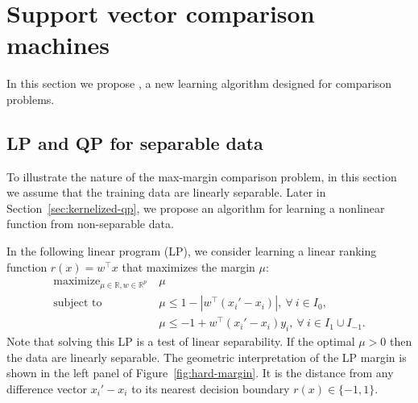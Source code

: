 \documentclass{article}
\newcommand{\RR}{\mathbb R}
\DeclareMathOperator*{\maximize}{maximize}
\begin{document}
\section{Support vector comparison machines}
\label{sec:svm-compare}

In this section we propose , a new learning algorithm
designed for comparison problems.

\subsection{LP and QP for separable data}
\label{sec:lp-qp}

To illustrate the nature of the max-margin comparison problem, in this
section we assume that the training data are linearly separable. Later
in Section~\ref{sec:kernelized-qp}, we propose an algorithm for
learning a nonlinear function from non-separable data.

In the following linear program (LP), we consider learning a linear
ranking function $r(x)=w^\intercal x$ that maximizes the margin $\mu$:
\begin{equation}
  \label{eq:max-margin-lp}
  \begin{aligned}
    \maximize_{\mu\in\RR, w\in\RR^p}\ & \mu \\
    \text{subject to}\ & \mu \leq 1-|w^\intercal (x_i' - x_i)|,\
    \forall\  i\in I_0,\\
    &\mu \leq -1 +  w^\intercal(x_i'-x_i)y_i,\ \forall\ i\in I_1\cup I_{-1}.
  \end{aligned}
\end{equation}
Note that solving this LP is a test of linear separability. If the
optimal $\mu>0$ then the data are linearly separable. The geometric
interpretation of the LP margin is shown in the left panel of
Figure~\ref{fig:hard-margin}. It is the distance from any difference
vector $x_i'-x_i$ to its nearest decision boundary $r(x)\in\{-1,1\}$.
\end{document}
